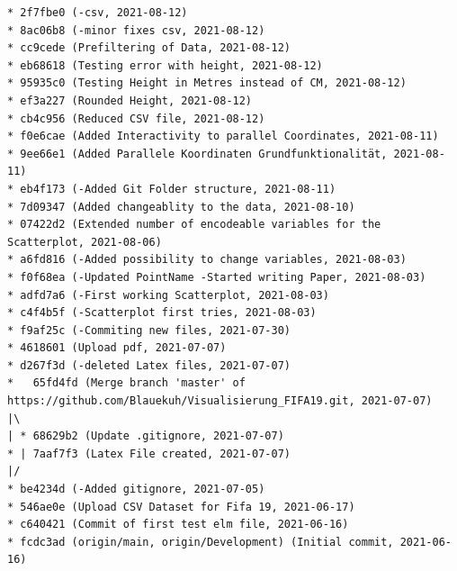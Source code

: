 \documentclass[usegeometry=true]{scrartcl}
\begin{document}
\begin{verbatim}
* 2f7fbe0 (-csv, 2021-08-12)
* 8ac06b8 (-minor fixes csv, 2021-08-12)
* cc9cede (Prefiltering of Data, 2021-08-12)
* eb68618 (Testing error with height, 2021-08-12)
* 95935c0 (Testing Height in Metres instead of CM, 2021-08-12)
* ef3a227 (Rounded Height, 2021-08-12)
* cb4c956 (Reduced CSV file, 2021-08-12)
* f0e6cae (Added Interactivity to parallel Coordinates, 2021-08-11)
* 9ee66e1 (Added Parallele Koordinaten Grundfunktionalität, 2021-08-11)
* eb4f173 (-Added Git Folder structure, 2021-08-11)
* 7d09347 (Added changeablity to the data, 2021-08-10)
* 07422d2 (Extended number of encodeable variables for the Scatterplot, 2021-08-06)
* a6fd816 (-Added possibility to change variables, 2021-08-03)
* f0f68ea (-Updated PointName -Started writing Paper, 2021-08-03)
* adfd7a6 (-First working Scatterplot, 2021-08-03)
* c4f4b5f (-Scatterplot first tries, 2021-08-03)
* f9af25c (-Commiting new files, 2021-07-30)
* 4618601 (Upload pdf, 2021-07-07)
* d267f3d (-deleted Latex files, 2021-07-07)
*   65fd4fd (Merge branch 'master' of 
https://github.com/Blauekuh/Visualisierung_FIFA19.git, 2021-07-07)
|\
| * 68629b2 (Update .gitignore, 2021-07-07)
* | 7aaf7f3 (Latex File created, 2021-07-07)
|/
* be4234d (-Added gitignore, 2021-07-05)
* 546ae0e (Upload CSV Dataset for Fifa 19, 2021-06-17)
* c640421 (Commit of first test elm file, 2021-06-16)
* fcdc3ad (origin/main, origin/Development) (Initial commit, 2021-06-16)
\end{verbatim}



\printbibliography
\end{document}
